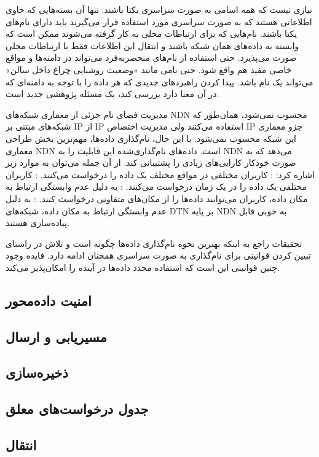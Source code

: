 نیازی نیست که همه اسامی به صورت سراسری یکتا باشند. تنها آن بسته‌هایی که حاوی اطلاعاتی هستند که به صورت سراسری مورد استفاده قرار می‌گیرند باید دارای نام‌های یکتا باشند. نام‌‌هایی که برای ارتباطات محلی به کار گرفته می‌شوند ممکن است که وابسته به داده‌های همان شبکه باشند و انتقال این اطلاعات فقط با ارتباطات محلی صورت می‌پذیرد. حتی استفاده از نام‌های منحصربه‌فرد می‌تواند در دامنه‌ها و مواقع خاصی مفید هم واقع شود. حتی نامی مانند «وضعیت روشنایی چراغ داخل سالن» می‌تواند یک نام باشد. پیدا کردن راهبردهای جدیدی که هر داده را با توجه به دامنه‌ای که در ‌آن معنا دارد بررسی کند، یک مسئله پژوهشی جدید است. 

مدیریت فضای نام جزئی از معماری شبکه‌های NDN  محسوب نمی‌شود، همان‌طور که شبکه‌های مبتنی بر IP از IP استفاده می‌کنند ولی مدیریت اختصاص IP جزو معماری این شبکه محسوب نمی‌شود. با این حال، نام‌گذاری داده‌‌ها، مهم‌ترین بخش طراحی معماری NDN است. داده‌های نام‌گذاری‌شده این قابلیت را به NDN می‌دهد که به صورت خودکار کارایی‌های زیادی را پشتیبانی کند. از آن جمله می‌توان به موارد زیر اشاره کرد:
 : کاربران مختلفی در مواقع مختلف یک داده را درخواست می‌کنند. 
 : کاربران مختلفی یک داده را در یک زمان درخواست می‌کنند.
 :‌  به دلیل عدم وابستگی ارتباط به مکان داده، کاربران می‌توانند داده‌ها را از مکان‌های متفاوتی درخواست کنند. 
 : به دلیل عدم وابستگی ارتباط به مکان داده، شبکه‌های DTN بر پایه NDN به خوبی قابل پیاده‌سازی هستند. 

تحقیقات راجع به اینکه بهترین نحوه نام‌گذاری داده‌ها چگونه است و تلاش در راستای تبیین کردن قوانینی برای نام‌گذاری به صورت سراسری همچنان ادامه دارد. فایده وجود چنین قوانینی این است که استفاده مجدد داده‌ها در آینده را امکان‌پذیر می‌کند.  



 


\subsection{امنیت داده‌محور}
\subsection{مسیریابی و ارسال}
\subsection{ذخیره‌سازی}
\subsection{جدول درخواست‌های معلق}
\subsection{انتقال}